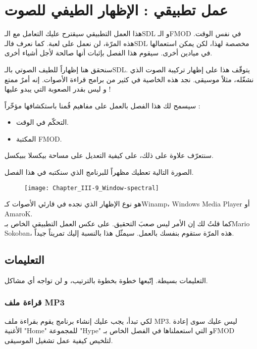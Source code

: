 \chapter{عمل تطبيقي : الإظهار الطيفي للصوت}

هذا العمل التطبيقي سيقترح عليك التعامل مع الـ\textenglish{SDL}
و الـ\textenglish{FMOD}
في نفس الوقت. هذه المرّة، لن نعمل على لعبة. كما نعرف فالـ\textenglish{SDL}
مخصصة لهذا، لكن يمكن استعمالها في ميادين أخرى. سيقوم هذا الفصل بإثبات أنها صالحة لأجل أشياء أخرى.

سنحقق هنا إظهاراً للطيف الصوتي بالـ\textenglish{SDL}.
يتوقّف هذا على إظهار تركيبة الصوت الذي نشغّله، مثلاً موسيقى. نجد هذه الخاصية في كثير من برامج قراءة الأصوات. إنه أمرٌ ممتع و ليس بقدر الصعوبة التي يبدو عليها !

سيسمح لك هذا الفصل بالعمل على مفاهيم قُمنا باستكشافها مؤخّراً :

\begin{itemize}
	\item التحكّم في الوقت.
	\item المكتبة 
	\textenglish{FMOD}.
\end{itemize}

سنتعرّف علاوة على ذلك، على كيفية التعديل على مساحة بيكسلا ببيكسل.

الصورة التالية تعطيك مظهراً للبرنامج الذي سنكتبه في هذا الفصل.

\begin{figure}[H]
	\centering
	\texttt{[image: Chapter\_III-9\_Window-spectral]}
\end{figure}

هو نوع الإظهار الذي نجده في قارئي الأصوات كـ\textenglish{Winamp}،
\textenglish{Windows Media Player} أو \textenglish{AmaroK}.\\
كما قلتُ لك إن الأمر ليس صعبَ التحقيق. على عكس العمل التطبيقي الخاص بـ\textenglish{Mario Sokoban}،
هذه المرّة ستقوم بنفسك بالعمل. سيمثّل هذا بالنسبة إليك تمريناً جيداً.

\section{التعليمات}

التعليمات بسيطة. إتّبعها خطوة بخطوة بالترتيب، و لن تواجه أي مشاكل.

\subsection{قراءة ملف \textenglish{MP3}}

لكي تبدأ، يجب عليك إنشاء برنامج يقوم بقراءة ملف
\textenglish{MP3}. ليس عليك سوى إعادة
الأغنية 
"\textenglish{Home}"
للمجموعة
"\textenglish{Hype}"
و التي استعملناها في الفصل الخاص بـ\textenglish{FMOD}
لتلخيص كيفية عمل تشغيل الموسيقى.

